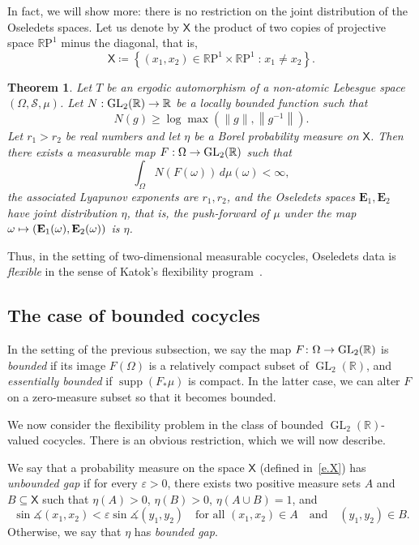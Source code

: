 \documentclass[10pt]{amsart}
\newtheorem{theo}{Theorem}[section]
\theoremstyle{definition}\newtheorem{defi}[theo]{Definition}\newtheorem{rema}[theo]{Remark}\newtheorem{exam}[theo]{Example}\newtheorem{exem}[theo]{Example}\newtheorem{nota}[theo]{Notation}
\DeclareMathOperator{\supp}{supp}
\newcommand{\R}{\mathbb{R}}
\newcommand{\E}{\mathbf{E}}
\newcommand{\sfX}{\mathsf{X}}
\newcommand{\st}{\;\mathord{:}\;}
\newcommand{\clS}{\mathcal{S}}
\newcommand{\rmP}{\mathrm{P}}
\DeclareMathOperator{\GL}{GL}
\renewcommand{\epsilon}{\varepsilon}
\renewcommand{\angle}{\measuredangle}
\renewcommand*{\to}{\mathchoice{\longrightarrow}{\rightarrow}{\rightarrow}{\rightarrow}}
\let\oldmapsto\mapsto
\renewcommand*{\mapsto}{\mathchoice{\longmapsto}{\oldmapsto}{\oldmapsto}{\oldmapsto}}
\begin{document}
In fact, we will show more: there is no restriction on the joint distribution of the Oseledets spaces. Let us denote by $\sfX$ the product of two copies of projective space $\R\rmP^1$ minus the diagonal, that is,
\begin{equation}\label{e.X}
\sfX \coloneqq \left\{(x_1,x_2) \in \R\rmP^1 \times \R\rmP^1 \st x_1 \neq x_2 \right\}.
\end{equation}


\begin{theo}\label{t.flexible}
Let $T$ be an ergodic automorphism of a non-atomic Lebesgue space $(\Omega,\clS,\mu)$. Let $N:\GL_2(\R) \to \R$ be a locally bounded function such that
\begin{equation}\label{e.lowerN}
N(g) \ge \log \max\left(\|g\|, \left\|g^{-1}\right\|\right).
\end{equation}
Let $r_1 > r_2$ be real numbers and let $\eta$ be a Borel probability measure on $\sfX$. Then there exists a measurable map $F:\Omega \to \GL_2(\R)$ such that
\begin{equation}\label{e.super-integrability}
\int_{\Omega} N(F(\omega)) \, d\mu(\omega) < \infty,
\end{equation}
the associated Lyapunov exponents are $r_1,r_2$, and the Oseledets spaces $\E_1,\E_2$ have joint distribution $\eta$, that is, the push-forward of $\mu$ under the map $\omega \mapsto (\E_1(\omega),\E_2(\omega))$ is $\eta$.
\end{theo}


Thus, in the setting of two-dimensional measurable cocycles, Oseledets data is \emph{flexible} in the sense of Katok's flexibility program~\cite{BKRH}.


\subsection{The case of bounded cocycles}

In the setting of the previous subsection, we say the map $F \colon \Omega \to \GL_2(\R)$ is \emph{bounded} if its image $F(\Omega)$ is a relatively compact subset of $\GL_2(\R)$, and \emph{essentially bounded} if $\supp(F_*\mu)$ is compact. In the latter case, we can alter $F$ on a zero-measure subset so that it becomes bounded.

We now consider the flexibility problem in the class of bounded $\GL_2(\R)$-valued cocycles. There is an obvious restriction, which we will now describe.

We say that a probability measure on the space $\sfX$ (defined in~\eqref{e.X}) has \emph{unbounded gap} if for every $\epsilon>0$, there exists two positive measure sets $A$ and $B \subseteq \sfX$ such that $\eta(A)>0$, $\eta(B)>0$, $\eta(A \cup B) = 1$, and
\begin{equation}
\sin \angle(x_1,x_2) < \epsilon \sin\angle(y_1,y_2) \quad \text{for all }(x_1,x_2)\in A\quad\text{and}\quad (y_1,y_2)\in B.
\end{equation}
Otherwise, we say that $\eta$ has \emph{bounded gap}.
\end{document}

